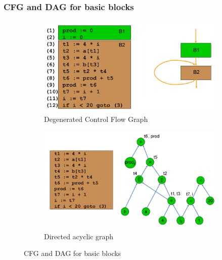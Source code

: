 \subsubsection{CFG and DAG for basic blocks}
\begin{figure}[h]
	\begin{center}
	\begin{subfigure}[b]{0.45\textwidth}
		\includegraphics[width=\textwidth]{images/Degen_CFG.png}
		\caption{Degenerated Control Flow Graph}
		\label{fig:degen_CFG}
	\end{subfigure}
	\hfill
	\begin{subfigure}[b]{0.45\textwidth}
		\includegraphics[width=\textwidth]{images/DAG_bb.png}
		\caption{Directed acyclic graph}
		\label{fig:DAG_basic_block}
	\end{subfigure}
	\caption{CFG and DAG for basic blocks}
	\end{center}
\end{figure}

